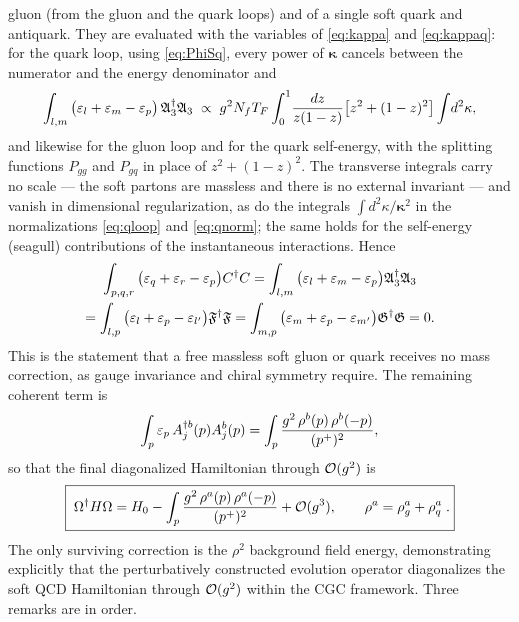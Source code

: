 gluon (from the gluon and the quark loops) and of a single soft quark and antiquark. They are
evaluated with the variables of \eqref{eq:kappa} and \eqref{eq:kappaq}: for the quark loop, using
\eqref{eq:PhiSq}, every power of $\bm\kappa$ cancels between the numerator and the energy
denominator and
\begin{equation}
\int_{l,m}\big(\varepsilon_{l}+\varepsilon_{m}-\varepsilon_{p}\big)\,\mathfrak{A}_{3}^{\dagger}\mathfrak{A}_{3}
\;\propto\;g^{2}N_{f} T_{F}\int_{0}^{1}\!\frac{dz}{z(1-z)}\big[z^{2}+(1-z)^{2}\big]\int\!d^{2}\kappa ,
\end{equation}
and likewise for the gluon loop and for the quark self-energy, with the splitting functions
$P_{gg}$ and $P_{gq}$ in place of $z^{2}+(1-z)^{2}$. The transverse integrals carry no scale --- the
soft partons are massless and there is no external invariant --- and vanish in dimensional
regularization, as do the integrals $\int d^{2}\kappa/\bm\kappa^{2}$ in the normalizations
\eqref{eq:qloop} and \eqref{eq:qnorm}; the same holds for the self-energy (seagull) contributions of the
instantaneous interactions. Hence
\begin{multline}
\int_{p,q,r}\big(\varepsilon_{q}+\varepsilon_{r}-\varepsilon_{p}\big)C^{\dagger}C
=\int_{l,m}\big(\varepsilon_{l}+\varepsilon_{m}-\varepsilon_{p}\big)\mathfrak{A}_{3}^{\dagger}\mathfrak{A}_{3}
\\=\int_{l,p}\big(\varepsilon_{l}+\varepsilon_{p}-\varepsilon_{l'}\big)\mathfrak{F}^{\dagger}\mathfrak{F}
=\int_{m,p}\big(\varepsilon_{m}+\varepsilon_{p}-\varepsilon_{m'}\big)\mathfrak{G}^{\dagger}\mathfrak{G}=0 .
\label{eq:loops0}
\end{multline}
This is the statement that a free massless soft gluon or quark receives no mass correction, as
gauge invariance and chiral symmetry require. The remaining coherent term is
\begin{equation}
\int_{p}\varepsilon_{p}\,A^{\dagger b}_{j}(p)A^{b}_{j}(p)=\int_{p}\frac{g^{2}\,\rho^{b}(p)\,\rho^{b}(-p)}{(p^{+})^{2}},
\label{eq:WW}
\end{equation}
so that the final diagonalized Hamiltonian through $\mathcal{O}(g^{2})$ is
\begin{equation}
\boxed{\;
\Omega^{\dagger}H\Omega=H_{0}-\int_{p}\frac{g^{2}\,\rho^{a}(p)\,\rho^{a}(-p)}{(p^{+})^{2}}+\mathcal{O}(g^{3}),
\qquad \rho^{a}=\rho^{a}_{g}+\rho^{a}_{q}\; .}
\label{eq:diagfinal}
\end{equation}
The only surviving correction is the $\rho^{2}$ background field energy, demonstrating explicitly
that the perturbatively constructed evolution operator diagonalizes the soft QCD Hamiltonian through
$\mathcal{O}(g^{2})$ within the CGC framework. Three remarks are in order.

